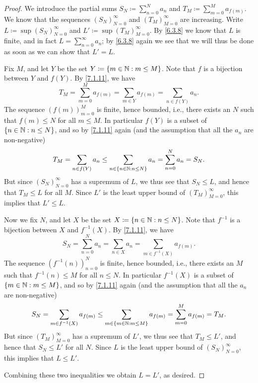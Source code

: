 \begin{proof}
  We introduce the partial sums \(S_N \coloneqq \sum_{n = 0}^N a_n\) and \(T_M \coloneqq \sum_{m = 0}^M a_{f(m)}\).
  We know that the sequences \((S_N)_{N = 0}^\infty\) and \((T_M)_{M = 0}^\infty\) are increasing.
  Write \(L \coloneqq \sup(S_N)_{N = 0}^\infty\) and \(L' \coloneqq \sup(T_M)_{M = 0}^\infty\).
  By \cref{6.3.8} we know that \(L\) is finite, and in fact \(L = \sum_{n = 0}^\infty a_n\);
  by \cref{6.3.8} again we see that we will thus be done as soon as we can show that \(L' = L\).

  Fix \(M\), and let \(Y\) be the set \(Y \coloneqq \left\lbrace m \in \mathbb{N} : m \leq M\right\rbrace\).
  Note that \(f\) is a bijection between \(Y\) and \(f(Y)\).
  By \cref{7.1.11}, we have
  \[
    T_M = \sum_{m = 0}^M a_{f(m)} = \sum_{m \in Y} a_{f(m)} = \sum_{n \in f(Y)} a_n.
  \]
  The sequence \((f(m))_{m = 0}^M\) is finite, hence bounded, i.e., there exists an \(N\) such that \(f(m) \leq N\) for all \(m \leq M\).
  In particular \(f(Y)\) is a subset of \(\left\lbrace n \in \mathbb{N} : n \leq N\right\rbrace\), and so by \cref{7.1.11} again (and the assumption that all the \(a_n\) are non-negative)
  \[
    T_M = \sum_{n \in f(Y)} a_n \leq \sum_{n \in \left\lbrace n \in \mathbb{N} : n \leq N\right\rbrace} a_n = \sum_{n = 0}^N a_n = S_N.
  \]
  But since \((S_N)_{N = 0}^\infty\) has a supremum of \(L\), we thus see that \(S_N \leq L\), and hence that \(T_M \leq L\) for all \(M\).
  Since \(L'\) is the least upper bound of \((T_M)_{M = 0}^\infty\), this implies that \(L' \leq L\).

  Now we fix \(N\), and let \(X\) be the set \(X \coloneqq \left\lbrace n \in \mathbb{N} : n \leq N\right\rbrace\).
  Note that \(f^{-1}\) is a bijection between \(X\) and \(f^{-1}(X)\).
  By \cref{7.1.11}, we have
  \[
    S_N = \sum_{n = 0}^N a_n = \sum_{n \in X} a_n = \sum_{m \in f^{-1}(X)} a_{f(m)}.
  \]
  The sequence \((f^{-1}(n))_{n = 0}^N\) is finite, hence bounded, i.e., there exists an \(M\) such that \(f^{-1}(n) \leq M\) for all \(n \leq N\).
  In particular \(f^{-1}(X)\) is a subset of \(\left\lbrace m \in \mathbb{N} : m \leq M\right\rbrace\), and so by \cref{7.1.11} again (and the assumption that all the \(a_n\) are non-negative)
  \[
    S_N = \sum_{m \in f^{-1}(X)} a_{f(m)} \leq \sum_{m \in \left\lbrace m \in \mathbb{N} : m \leq M\right\rbrace} a_{f(m)} = \sum_{m = 0}^M a_{f(m)} = T_M.
  \]
  But since \((T_M)_{M = 0}^\infty\) has a supremum of \(L'\), we thus see that \(T_M \leq L'\), and hence that \(S_N \leq L'\) for all \(N\).
  Since \(L\) is the least upper bound of \((S_N)_{N = 0}^\infty\), this implies that \(L \leq L'\).

  Combining these two inequalities we obtain \(L = L'\), as desired.
\end{proof}

